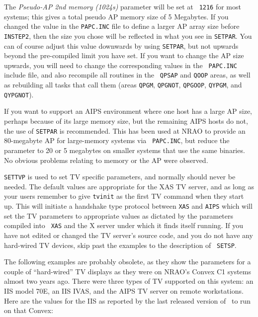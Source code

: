 The {\it Pseudo-AP 2nd memory (1024s)\/} parameter will be set at {\tt
1216} for most systems; this gives a total pseudo AP memory size of 5
Megabytes.  If you changed the value in the {\tt PAPC.INC} file to define
a larger AP array size before {\tt INSTEP2}, then the size you chose will
be reflected in what you see in {\tt SETPAR}.  You can of course adjust
this value downwards by using {\tt SETPAR}, but not upwards beyond the
pre-compiled limit you have set.  If you want to change the AP size
upwards, you will need to change the corresponding values in the {\tt
PAPC.INC} include file, and also recompile all routines in the {\tt\dol
QPSAP} and {\tt\dol QOOP} areas, as well as rebuilding all tasks that call
them (areas {\tt QPGM}, {\tt QPGNOT}, {\tt QPGOOP}, {\tt QYPGM}, and {\tt
QYPGNOT}).

If you want to support an AIPS environment where one host has a large AP
size, perhaps because of its large memory size, but the remaining AIPS
hosts do not, the use of {\tt SETPAR} is recommended.  This has been used
at NRAO to provide an 80-megabyte AP for large-memory systems via {\tt
PAPC.INC}, but reduce the parameter to 20 or 5 megabytes on smaller
systems that use the same binaries.  No obvious problems relating to
memory or the AP were observed.

{\tt SETTVP} is used to set TV specific parameters, and normally should
never be needed.  The default values are appropriate for the XAS TV
server, and as long as your users remember to give {\tt tvinit} as the
first TV command when they start up.  This will initiate a handshake type
protocol between {\tt XAS} and {\tt AIPS} which will set the TV parameters
to appropriate values as dictated by the parameters compiled into {\tt
XAS} and the X server under which it finds itself running.  If you have
not edited or changed the TV server's source code, and you do not have any
hard-wired TV devices, skip past the examples to the description of {\tt
SETSP}.

The following examples are probably obsolete, as they show the parameters
for a couple of ``hard-wired'' TV displays as they were on NRAO's Convex
C1 systems almost two years ago.  There were three types of TV supported
on this system: an IIS model 70E, an IIS IVAS, and the AIPS TV server on
remote workstations.  Here are the values for the IIS as reported by the
last released version of \AIPS\ to run on that Convex:
\medskip

